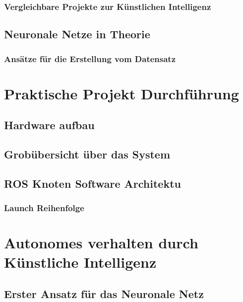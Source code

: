 \documentclass[conference]{IEEEtran}
\begin{document}
\subsubsection{Vergleichbare Projekte zur Künstlichen Intelligenz} %
\subsection{Neuronale Netze in Theorie}	%

\subsubsection{Ansätze für die Erstellung vom Datensatz}	%

\section{Praktische Projekt Durchführung }

\subsection{Hardware aufbau}%

\subsection{Grobübersicht über das System}	%

\subsection{ROS Knoten Software Architektu}

\subsubsection{ Launch Reihenfolge}%

\section{Autonomes verhalten durch Künstliche Intelligenz  }	%

\subsection{Erster Ansatz für das Neuronale Netz}	%
\end{document}
